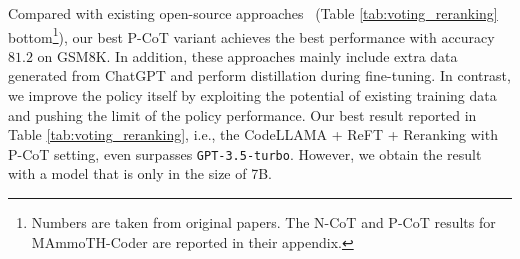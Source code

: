 Compared with existing open-source approaches~\cite{luo2023wizardmath,wang2023mathcoder,yue2023mammoth} (Table \ref{tab:voting_reranking} bottom\footnote{Numbers are taken from original papers. The N-CoT and P-CoT results for MAmmoTH-Coder are reported in their appendix.}), our best P-CoT variant achieves the best performance with accuracy $81.2$ on GSM8K. 
In addition, these approaches mainly include extra data generated from ChatGPT and perform distillation during fine-tuning. 
In contrast, we improve the policy itself by exploiting the potential of existing training data and pushing the limit of the policy performance. 
Our best result reported in Table \ref{tab:voting_reranking}, 
i.e., the CodeLLAMA + ReFT  + Reranking with P-CoT setting, 
even surpasses \texttt{GPT-3.5-turbo}.
However, we obtain the result with a model that is only in the size of 7B. 

\begin{table}[t!]
    \centering
    \caption{Experiments on P-CoT with Galactica-125M, Codeparrot-small and Codegen-350M.}
    \label{tab:small_model}
\end{table}

